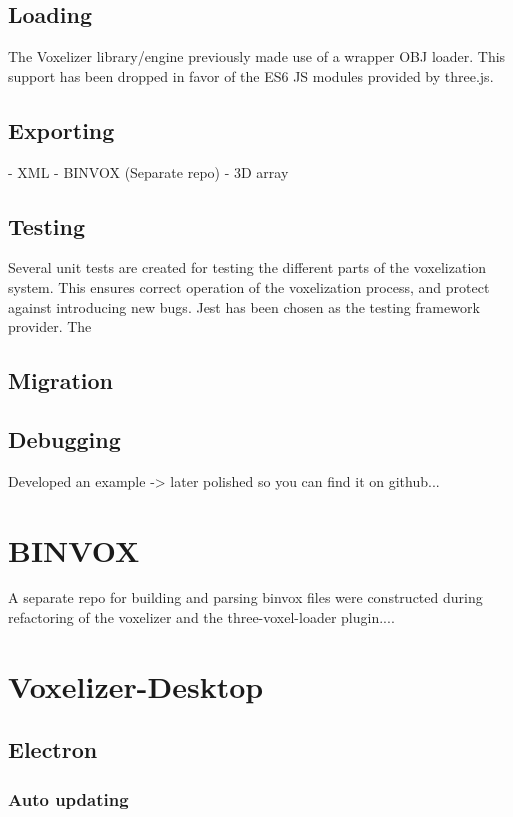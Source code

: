 \subsection{Loading}
The Voxelizer library/engine previously made use of a wrapper OBJ loader.
This support has been dropped in favor of the ES6 JS modules provided by three.js.

\subsection{Exporting}
- XML
- BINVOX (Separate repo)
- 3D array

\subsection{Testing}
Several unit tests are created for testing the different parts of the voxelization system. This ensures correct operation of the voxelization process, and protect against introducing new bugs.  Jest has been chosen as the testing framework provider. The 
\subsection{Migration}


\subsection{Debugging}
Developed an example -> later polished so you can find it on github...

\section{BINVOX}
\label{sec:method-binvox}
A separate repo for building and parsing binvox files were constructed during refactoring of the voxelizer and the three-voxel-loader plugin....



\section{Voxelizer-Desktop}
\subsection{Electron}
\subsubsection{Auto updating}

